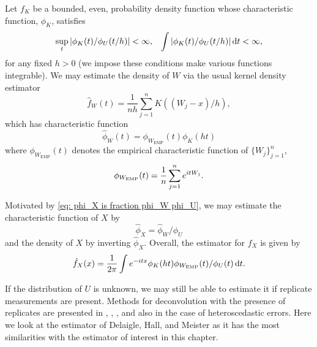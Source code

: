 	Let $f_K$ be a bounded, even, probability density function whose characteristic function, $\phi_K$, satisfies
	\begin{align}
		\sup_t |\phi_K(t) / \phi_U(t / h) | < \infty, &&\int|\phi_K(t) / \phi_U(t / h)| \, \mathrm{d} t < \infty,
	\end{align}
	for any fixed $h > 0$ (we impose these conditions make various functions integrable). We may estimate the density of $W$ via the usual kernel density estimator
	\begin{equation}
		\hat{f}_W(t) = \frac{1}{n h} \sum_{j = 1}^n K((W_j - x)/h),
	\end{equation}
	which has characteristic function
	\begin{equation}
		\hat{\phi}_W(t) = \phi_{W_\mathrm{EMP}}(t) \phi_K(h t)
	\end{equation}
	where $\phi_{W_\mathrm{EMP}}(t)$ denotes the empirical characteristic function of $\{W_j\}_{j = 1}^n$,
	\begin{equation}
		\phi_{W_\mathrm{EMP}}(t) = \frac{1}{n}\sum_{j = 1}^n e^{itW_j}.
	\end{equation}

	Motivated by \eqref{eq: phi_X is fraction phi_W phi_U}, we may estimate the characteristic function of $X$ by 
	\begin{equation}
		\hat{\phi}_X = \hat{\phi}_W / \phi_U
	\end{equation}
	and the density of $X$ by inverting $\hat{\phi}_X$. Overall, the estimator for $f_X$ is given by
	\begin{equation}
	\label{eq:standard deconvolution estimator}
		\hat{f}_X(x) = \frac{1}{2\pi} \int e^{-itx} \phi_K(ht) \phi_{W_\mathrm{EMP}}(t)  / \phi_U(t) \, \mathrm{d} t.
	\end{equation}

	If the distribution of $U$ is unknown, we may still be able to estimate it if replicate measurements are present. Methods for deconvolution with the presence of replicates are presented in \cite{Li1998-mj}, \cite{Lin2006-mm}, \cite{Delaigle2008-hl}, and also \cite{McIntyre2011-fg} in the case of heteroscedastic errors. Here we look at the estimator of Delaigle, Hall, and Meister \cite{Delaigle2008-hl} as it has the most similarities with the estimator of interest in this chapter.

